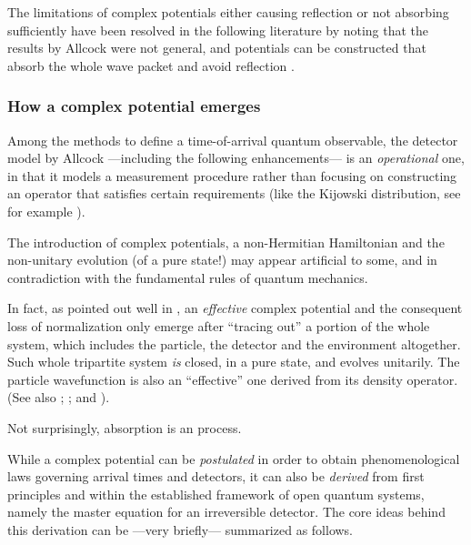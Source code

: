 The limitations of complex potentials either causing reflection
or not absorbing sufficiently have been resolved
in the following literature
by noting that the results by Allcock were not general, and
potentials can be constructed that absorb the whole wave packet
and avoid reflection \parencite{Muga_TOAQM, Muga_CompositeAbsPot, ComplexAbsPot}.

\subsubsection{How a complex potential emerges}

Among the methods to define a time-of-arrival quantum observable,
the detector model by Allcock
---including the following enhancements---
is an \emph{operational} one,
in that it models a measurement procedure \parencite[sec.9]{Leavens_TOA}
rather than focusing on constructing an operator that satisfies certain requirements
(like the Kijowski distribution, see for example \cite[sec.8]{Leavens_TOA}).

The introduction of complex potentials, a non-Hermitian Hamiltonian and
the non-unitary evolution (of a pure state!) may appear artificial to some,
and in contradiction with the fundamental rules of quantum mechanics.

\citereset
In fact, as pointed out well in \cite{Halliwell_Irreversible},
an \emph{effective} complex potential and the consequent loss of normalization
only emerge after ``tracing out'' a portion of the whole system,
which includes the particle, the detector and the environment altogether.
Such whole tripartite system \emph{is} closed, in a pure state, and evolves unitarily.
The particle wavefunction is also an ``effective'' one derived from its density operator.
(See also
  \cite{Wave-function_approach, Hegerfeldt_WignerSymposium, TheQuantumJumpApproach};
  \cite{TQM2:Jump};
and
  \cite[sec.6.7.1 ``Simulating Quantum Trajectories'']{WallsMilburn}).

Not surprisingly, absorption is an  process.

While a complex potential can be \emph{postulated} in order to obtain
phenomenological laws governing arrival times and detectors,
it can also be \emph{derived} from first principles and within the established framework
of open quantum systems, namely the master equation
for an irreversible detector.
The core ideas behind this derivation
can be ---very briefly--- summarized as follows.

